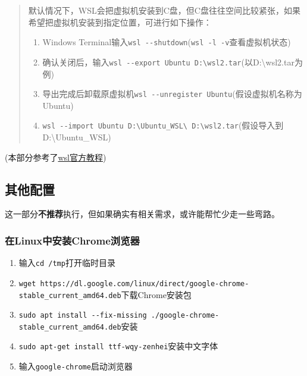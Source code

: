 \documentclass[
]{article}
\begin{document}
\begin{quote}
	默认情况下，WSL会把虚拟机安装到C盘，但C盘往往空间比较紧张，如果希望把虚拟机安装到指定位置，可进行如下操作：

	\begin{enumerate}
		\def\labelenumi{\arabic{enumi}.}
		\item \label{export}
		      Windows
		      Terminal输入\texttt{wsl\ -\/-shutdown}(\texttt{wsl\ -l\ -v}查看虚拟机状态)
		\item
		      确认关闭后，输入\texttt{wsl\ -\/-export\ Ubuntu\ D:\textbackslash{}wsl2.tar}(以D:\textbackslash wsl2.tar为例)
		\item
		      导出完成后卸载原虚拟机\texttt{wsl\ -\/-unregister\ Ubuntu}(假设虚拟机名称为Ubuntu)
		\item
		      \texttt{wsl\ -\/-import\ Ubuntu\ D:\textbackslash{}Ubuntu\_WSL\textbackslash{}\ D:\textbackslash{}wsl2.tar}(假设导入到D:\textbackslash Ubuntu\_WSL)
	\end{enumerate}
\end{quote}

(本部分参考了\href{https://learn.microsoft.com/zh-cn/windows/wsl/setup/environment}{wsl官方教程})

\subsection{其他配置}\label{ux5176ux4ed6ux914dux7f6e}

这一部分\textbf{不推荐}执行，但如果确实有相关需求，或许能帮忙少走一些弯路。

\subsubsection{在Linux中安装Chrome浏览器}\label{ux5728linuxux4e2dux5b89ux88c5chromeux6d4fux89c8ux5668}

\begin{enumerate}
	\def\labelenumi{\arabic{enumi}.}
	\item
	      输入\texttt{cd\ /tmp}打开临时目录
	\item
	      \texttt{wget\ https://dl.google.com/linux/direct/google-chrome-stable\_current\_amd64.deb}下载Chrome安装包
	\item
	      \texttt{sudo\ apt\ install\ -\/-fix-missing\ ./google-chrome-stable\_current\_amd64.deb}安装
	\item
	      \texttt{sudo\ apt-get\ install\ ttf-wqy-zenhei}安装中文字体
	\item
	      输入\texttt{google-chrome}启动浏览器
\end{enumerate}
\end{document}
